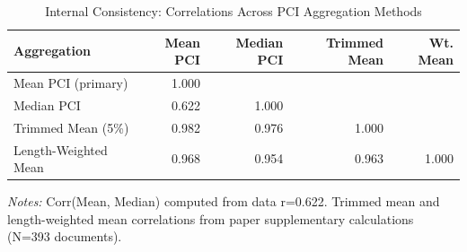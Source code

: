 \begin{table}[H]
\centering
\caption{Internal Consistency: Correlations Across PCI Aggregation Methods}
\label{tab:table4_aggregation}
\begin{threeparttable}
\small
\begin{tabular}{lrrrr}
\toprule
\textbf{Aggregation} & \textbf{Mean PCI} & \textbf{Median PCI} & \textbf{Trimmed Mean} & \textbf{Wt. Mean} \\
\midrule
Mean PCI (primary) & 1.000 &  &  &  \\
Median PCI & 0.622 & 1.000 &  &  \\
Trimmed Mean (5\%) & 0.982 & 0.976 & 1.000 &  \\
Length-Weighted Mean & 0.968 & 0.954 & 0.963 & 1.000 \\
\bottomrule
\end{tabular}
\begin{tablenotes}\small
\item \textit{Notes:} Corr(Mean, Median) computed from data r=0.622. Trimmed mean and length-weighted mean correlations from paper supplementary calculations (N=393 documents).
\end{tablenotes}
\end{threeparttable}
\end{table}